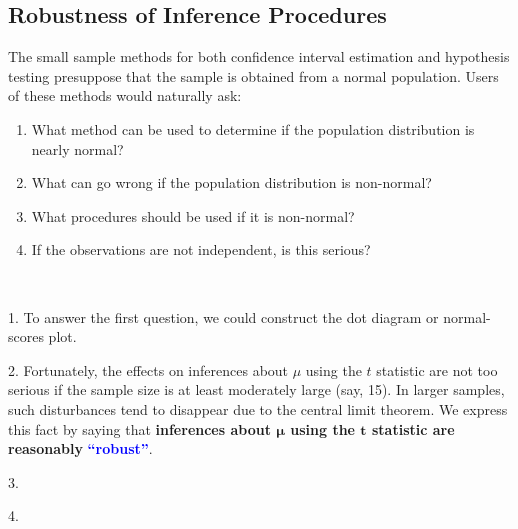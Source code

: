 \documentclass[12pt,a4paper]{article}
\begin{document}
\subsection{Robustness of Inference Procedures}
The small sample methods for both confidence interval estimation and hypothesis testing presuppose that the sample is obtained from a normal population. Users of these methods would naturally ask: \begin{enumerate}
	\item What method can be used to determine if the population distribution is nearly normal?
	\item What can go wrong if the population distribution is non-normal?
	\item What procedures should be used if it is non-normal?
	\item If the observations are not independent, is this serious?
\end{enumerate}\
\par
1. To answer the first question, we could construct the dot diagram or normal-scores plot. \\\par
2. Fortunately, the effects on inferences about $\mu$ using the $t$ statistic are not too serious if the sample size is at least moderately large (say, 15). In larger samples, such disturbances tend to disappear due to the central limit theorem. We express this fact by saying that \textbf{inferences about $\boldsymbol{\mu}$ using the $\boldsymbol{t}$ statistic are reasonably} \textcolor{blue}{\bf ``robust''}.\\\par
3.\\\par
4.
\\
\\
%
%
%	
%
%
%	
%	
\end{document}
